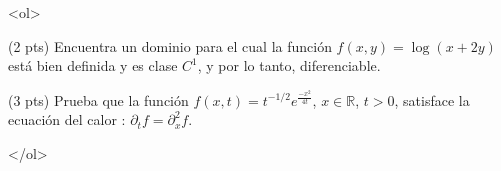 \documentclass[12pt]{article}
\begin{document}
\bigskip

            
\bigskip
\bigskip
\bigskip


<ol>

  
\item (2 pts) Encuentra un dominio para el cual la función
  $f(x,y)=\log(x+2y)$ está bien definida y
  es clase $C^1$, y por lo tanto, diferenciable.


  
\vspace{4cm}  


\item (3 pts) Prueba que la función
  $f(x,t)=t^{-1/2}e^{\frac{-x^2}{4t}}$, $x\in \mathbb{R}$, $t>0$,
  satisface la ecuación del calor : $\partial_t f= \partial_x^2f$.


</ol>


  
\end{document}
